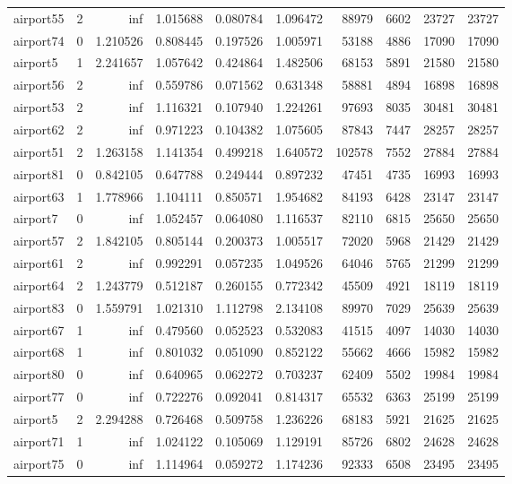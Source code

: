 \begin{longtable}{|l|r|r|r|r|r|r|r|r|r|}
airport55 & 2 & inf & 1.015688 & 0.080784 & 1.096472 & 88979 & 6602 & 23727 & 23727 \\
airport74 & 0 & 1.210526 & 0.808445 & 0.197526 & 1.005971 & 53188 & 4886 & 17090 & 17090 \\
airport5 & 1 & 2.241657 & 1.057642 & 0.424864 & 1.482506 & 68153 & 5891 & 21580 & 21580 \\
airport56 & 2 & inf & 0.559786 & 0.071562 & 0.631348 & 58881 & 4894 & 16898 & 16898 \\
airport53 & 2 & inf & 1.116321 & 0.107940 & 1.224261 & 97693 & 8035 & 30481 & 30481 \\
airport62 & 2 & inf & 0.971223 & 0.104382 & 1.075605 & 87843 & 7447 & 28257 & 28257 \\
airport51 & 2 & 1.263158 & 1.141354 & 0.499218 & 1.640572 & 102578 & 7552 & 27884 & 27884 \\
airport81 & 0 & 0.842105 & 0.647788 & 0.249444 & 0.897232 & 47451 & 4735 & 16993 & 16993 \\
airport63 & 1 & 1.778966 & 1.104111 & 0.850571 & 1.954682 & 84193 & 6428 & 23147 & 23147 \\
airport7 & 0 & inf & 1.052457 & 0.064080 & 1.116537 & 82110 & 6815 & 25650 & 25650 \\
airport57 & 2 & 1.842105 & 0.805144 & 0.200373 & 1.005517 & 72020 & 5968 & 21429 & 21429 \\
airport61 & 2 & inf & 0.992291 & 0.057235 & 1.049526 & 64046 & 5765 & 21299 & 21299 \\
airport64 & 2 & 1.243779 & 0.512187 & 0.260155 & 0.772342 & 45509 & 4921 & 18119 & 18119 \\
airport83 & 0 & 1.559791 & 1.021310 & 1.112798 & 2.134108 & 89970 & 7029 & 25639 & 25639 \\
airport67 & 1 & inf & 0.479560 & 0.052523 & 0.532083 & 41515 & 4097 & 14030 & 14030 \\
airport68 & 1 & inf & 0.801032 & 0.051090 & 0.852122 & 55662 & 4666 & 15982 & 15982 \\
airport80 & 0 & inf & 0.640965 & 0.062272 & 0.703237 & 62409 & 5502 & 19984 & 19984 \\
airport77 & 0 & inf & 0.722276 & 0.092041 & 0.814317 & 65532 & 6363 & 25199 & 25199 \\
airport5 & 2 & 2.294288 & 0.726468 & 0.509758 & 1.236226 & 68183 & 5921 & 21625 & 21625 \\
airport71 & 1 & inf & 1.024122 & 0.105069 & 1.129191 & 85726 & 6802 & 24628 & 24628 \\
airport75 & 0 & inf & 1.114964 & 0.059272 & 1.174236 & 92333 & 6508 & 23495 & 23495 \\

\end{longtable}
